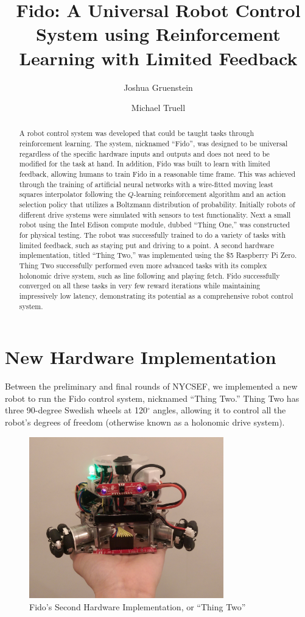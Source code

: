 \documentclass[letterpaper,11pt]{article}
\title{Fido: A Universal Robot Control System using Reinforcement Learning with Limited Feedback}
\author{Joshua Gruenstein \and Michael Truell}
\date{}
\begin{document}
	\maketitle

	\begin{abstract}
		A robot control system was developed that could be taught tasks through reinforcement learning.  The system, nicknamed ``Fido'', was designed to be universal regardless of the specific hardware inputs and outputs and does not need to be modified for the task at hand. In addition, Fido was built to learn with limited feedback, allowing humans to train Fido in a reasonable time frame. This was achieved through the training of artificial neural networks with a wire-fitted moving least squares interpolator following the $Q$-learning reinforcement algorithm and an action selection policy that utilizes a Boltzmann distribution of probability.  Initially robots of different drive systems were simulated with sensors to test functionality.  Next a small robot using the Intel Edison compute module, dubbed ``Thing One,'' was constructed for physical testing.  The robot was successfully trained to do a variety of tasks with limited feedback, such as staying put and driving to a point.   A second hardware implementation, titled ``Thing Two,'' was implemented using the \$5 Raspberry Pi Zero.  Thing Two successfully performed even more advanced tasks with its complex holonomic drive system, such as line following and playing fetch. Fido successfully converged on all these tasks in very few reward iterations while maintaining impressively low latency, demonstrating its potential as a comprehensive robot control system.
	\end{abstract}

	\section*{New Hardware Implementation}

	Between the preliminary and final rounds of NYCSEF, we implemented a new robot to run the Fido control system, nicknamed ``Thing Two.''  Thing Two has three 90-degree Swedish wheels at 120$^{\circ}$ angles, allowing it to control all the robot's degrees of freedom (otherwise known as a holonomic drive system).

	\begin{figure}[ht]
		\centering
		\includegraphics[height=7cm]{ThingTwo.png}
		\caption{Fido's Second Hardware Implementation, or ``Thing Two''}
	\end{figure}
\end{document}
